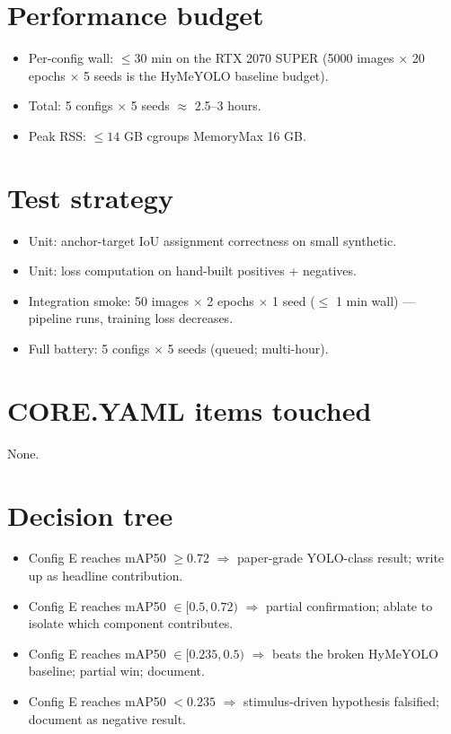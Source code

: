 \documentclass[11pt,a4paper]{article}
\begin{document}
\section{Performance budget}

\begin{itemize}
\item Per-config wall: $\leq 30$ min on the RTX 2070 SUPER (5000
  images $\times$ 20 epochs $\times$ 5 seeds is the HyMeYOLO baseline budget).
\item Total: 5 configs $\times$ 5 seeds $\approx$ 2.5--3 hours.
\item Peak RSS: $\leq 14$ GB cgroups MemoryMax 16 GB.
\end{itemize}

\section{Test strategy}

\begin{itemize}
\item Unit: anchor-target IoU assignment correctness on small synthetic.
\item Unit: loss computation on hand-built positives + negatives.
\item Integration smoke: 50 images $\times$ 2 epochs $\times$ 1 seed
  ($\leq$ 1 min wall) --- pipeline runs, training loss decreases.
\item Full battery: 5 configs $\times$ 5 seeds (queued; multi-hour).
\end{itemize}

\section{CORE.YAML items touched}

None.

\section{Decision tree}

\begin{itemize}
\item Config E reaches mAP50 $\geq 0.72$ $\Rightarrow$ paper-grade
  YOLO-class result; write up as headline contribution.
\item Config E reaches mAP50 $\in [0.5, 0.72)$ $\Rightarrow$
  partial confirmation; ablate to isolate which component contributes.
\item Config E reaches mAP50 $\in [0.235, 0.5)$ $\Rightarrow$ beats
  the broken HyMeYOLO baseline; partial win; document.
\item Config E reaches mAP50 $< 0.235$ $\Rightarrow$ stimulus-driven
  hypothesis falsified; document as negative result.
\end{itemize}
\end{document}
